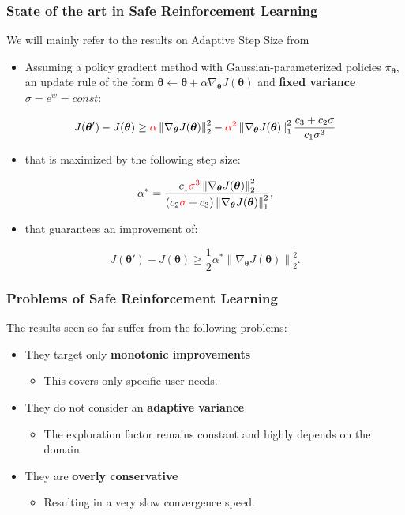 \documentclass{beamer}
\newcommand{\norm}[2][1]{\left\| #2 \right\|_{#1}}
\newcommand{\vtheta}{{\boldsymbol{\theta}}}
\newcommand*{\gradj}{\nabla_{\vtheta}J(\vtheta)}
\begin{document}



\begin{frame}
\frametitle{State of the art in Safe Reinforcement Learning}
We will mainly refer to the results on Adaptive Step Size from~\cite{adaptive_step}

\begin{itemize}
	\item Assuming a policy gradient method with Gaussian-parameterized policies $\pi_{\vtheta}$, an update rule of the form $\vtheta \gets \vtheta + \alpha\gradj$ and \textbf{fixed variance} $\sigma = e^w = const$:
\end{itemize}
\[
J(\vtheta') - J(\vtheta) \geq \textcolor{red}{\alpha} \norm[2]{\nabla_{\vtheta}J(\vtheta)}^2 - \textcolor{red}{\alpha^2} \norm[1]{\nabla_{\vtheta}J(\vtheta)}^2 \frac{c_3 + c_2 \sigma }{c_1 \sigma^3}
\]
\begin{itemize}
	\item that is maximized by the following step size: 
\end{itemize}
	\[
\alpha^* =  \frac{c_1 \textcolor{red}{\sigma^3} \norm[2]{\gradj}^2}{\left(c_2 \textcolor{red}{\sigma} + c_3 \right) \norm[1]{\gradj}^2},
\]
\begin{itemize}
\item that guarantees an improvement of:
\end{itemize}
\[
J(\vtheta') - J(\vtheta) \geq \frac{1}{2}\alpha^* \norm[2]{\gradj}^2.
\]



\end{frame}


\begin{frame}
\frametitle{Problems of Safe Reinforcement Learning}

The results seen so far suffer from the following problems:
\begin{itemize}
\item They target only \textbf{monotonic improvements}
\begin{itemize}
\item This covers only specific user needs.
\end{itemize}
\item They do not consider an \textbf{adaptive variance}
\begin{itemize}
\item The exploration factor remains constant and highly depends on the domain.
\end{itemize}
\item They are \textbf{overly conservative}
\begin{itemize}
\item Resulting in a very slow convergence speed.
\end{itemize}

\end{itemize}


\end{frame}
\end{document}
